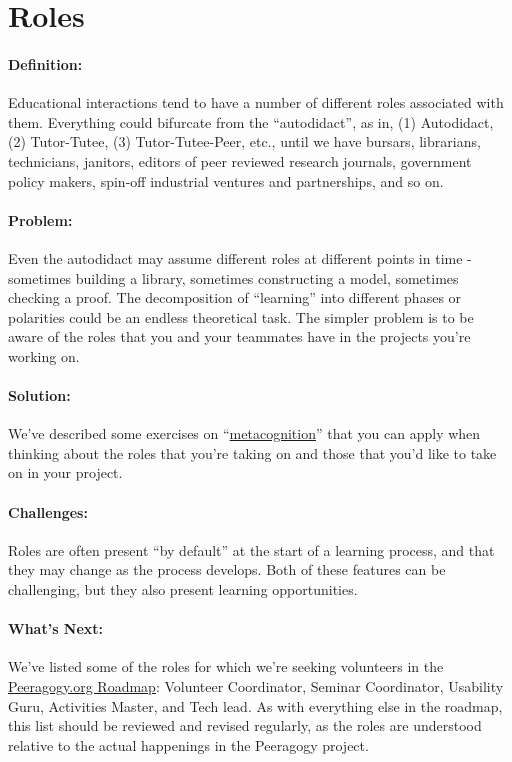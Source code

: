 \section{Roles}
\paragraph{Definition:} Educational interactions tend to have a number of
different roles associated with them. Everything could bifurcate from
the ``autodidact'', as in, (1) Autodidact, (2) Tutor-Tutee, (3)
Tutor-Tutee-Peer, etc., until we have bursars, librarians, technicians,
janitors, editors of peer reviewed research journals, government policy
makers, spin-off industrial ventures and partnerships, and so on.

\paragraph{Problem:} Even the autodidact may assume different roles at
different points in time - sometimes building a library, sometimes
constructing a model, sometimes checking a proof. The decomposition of
``learning'' into different phases or polarities could be an endless
theoretical task. The simpler problem is to be aware of the roles that
you and your teammates have in the projects you're working on.

\paragraph{Solution:} We've described some exercises on
``\href{http://peeragogy.org/can-we-work-together/}{metacognition}''
that you can apply when thinking about the roles that you're taking on
and those that you'd like to take on in your project.

\paragraph{Challenges:} Roles are often present ``by default'' at the start
of a learning process, and that they may change as the process develops.
Both of these features can be challenging, but they also present
learning opportunities.

\paragraph{What's Next:} We've listed some of the roles for which we're
seeking volunteers in
the \href{http://peeragogy.org/peeragogy-org-roadmap/}{Peeragogy.org
Roadmap}: Volunteer Coordinator, Seminar Coordinator, Usability Guru,
Activities Master, and Tech lead. As with everything else in the
roadmap, this list should be reviewed and revised regularly, as the
roles are understood relative to the actual happenings in the Peeragogy
project.
